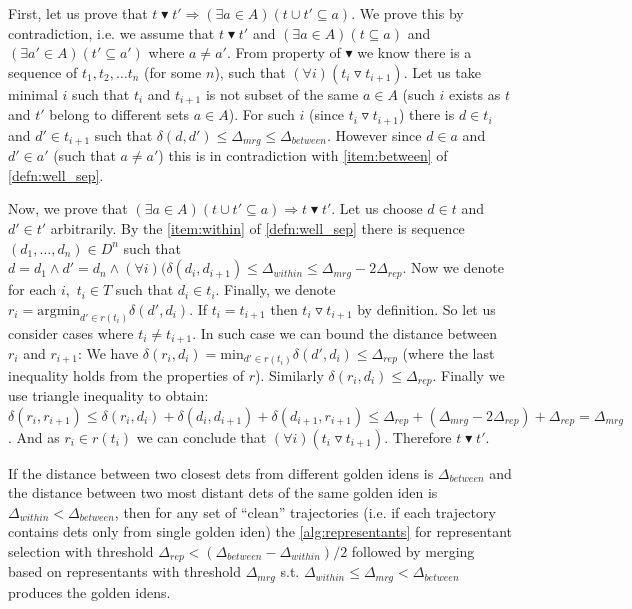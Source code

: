 \begin{myproof}
First, let us prove that $t \blacktriangledown t' \Rightarrow (\exists a \in A) (t \cup t' \subseteq a)$. We prove this by contradiction, i.e. we assume
that $t \blacktriangledown t'$ and $(\exists a \in A) (t \subseteq a)$ and $(\exists a' \in A) (t' \subseteq a')$ where $a \neq a'$. From property of $\blacktriangledown$ we know there is a sequence of $t_1, t_2, \ldots t_n$ (for some $n$), such that $(\forall i) (t_i \triangledown t_{i+1})$. Let
us take minimal $i$ such that $t_i$ and $t_{i+1}$ is not subset of the same
$a \in A$ (such $i$ exists as $t$ and $t'$ belong to different sets $a \in A$).
For such $i$ (since $t_i \triangledown t_{i+1}$) there is $d \in t_i$ and
$d' \in t_{i+1}$ such that $\delta(d, d') \leq \Delta_{mrg} \leq \Delta_{between}$. However since $d \in a$
and $d' \in a'$ (such that $a \neq a'$) this is in contradiction with \ref{item:between} of \autoref{defn:well_sep}.

Now, we prove that $(\exists a \in A) (t \cup t' \subseteq a) \Rightarrow t \blacktriangledown t'$. Let us choose $d \in t$ and $d' \in t'$ arbitrarily. By the
\ref{item:within} of \autoref{defn:well_sep} there is sequence $(d_1, \ldots, d_n) \in D^n$
such that $d = d_1 \land d' = d_n \land (\forall i) (\delta(d_i, d_{i+1}) \leq \Delta_{within} \leq \Delta_{mrg} - 2\Delta_{rep}$. Now we denote for each $i,$ $t_i \in T$ such that
$d_i \in t_i$. Finally, we denote $r_i = \mathrm{argmin}_{d' \in r(t_i)} \delta(d', d_i)$. If $t_i = t_{i+1}$ then $t_i \triangledown t_{i+1}$ by definition.
So let us consider cases where $t_i \neq t_{i+1}$. In such case we can bound
the distance between $r_i$ and $r_{i+1}$: We have $\delta(r_i, d_i) = \mathrm{min}_{d' \in r(t_i)} \delta(d', d_i) \leq \Delta_{rep}$ (where the last inequality holds from the properties of $r$). Similarly  $\delta(r_i, d_i) \leq \Delta_{rep}$. Finally we use triangle inequality to obtain: $\delta(r_i, r_{i+1}) \leq \delta(r_i, d_i) + \delta(d_i, d_{i+1}) + \delta(d_{i+1}, r_{i+1}) \leq \Delta_{rep} + (\Delta_{mrg} - 2\Delta_{rep}) + \Delta_{rep} = \Delta_{mrg}$. And as $r_i \in r(t_i)$ we can conclude that $(\forall i) (t_i \triangledown t_{i+1})$. Therefore $t \blacktriangledown t'$.\end{myproof}


\begin{cor}
If the distance between two closest \glspl{det} from different golden
\glspl{iden} is $\Delta_{between}$ and the distance between two most distant \glspl{det}
of the same golden \gls{iden} is $\Delta_{within} < \Delta_{between}$, then for any set of ``clean''
trajectories (i.e. if each trajectory contains \glspl{det} only from single
golden \gls{iden}) the \autoref{alg:representants} for representant selection
with threshold $\Delta_{rep} < (\Delta_{between} - \Delta_{within}) / 2$ followed by merging based on representants with
threshold $\Delta_{mrg}$ s.t. $\Delta_{within} \leq \Delta_{mrg} < \Delta_{between}$ produces the golden \glspl{iden}.
\end{cor}

